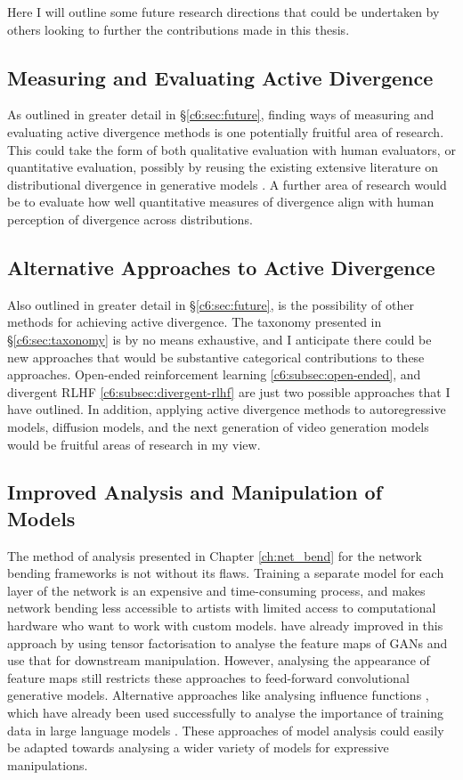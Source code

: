 Here I will outline some future research directions that could be undertaken by others looking to further the contributions made in this thesis.

\subsection{Measuring and Evaluating Active Divergence}
As outlined in greater detail in \S \ref{c6:sec:future}, finding ways of measuring and evaluating active divergence methods is one potentially fruitful area of research. 
This could take the form of both qualitative evaluation with human evaluators, or quantitative evaluation, possibly by reusing the existing extensive literature on distributional divergence in generative models \citep{gretton2019interpretable}.
A further area of research would be to evaluate how well quantitative measures of divergence align with human perception of divergence across distributions.

\subsection{Alternative Approaches to Active Divergence}
Also outlined in greater detail in \S \ref{c6:sec:future}, is the possibility of other methods for achieving active divergence. 
The taxonomy presented in \S \ref{c6:sec:taxonomy} is by no means exhaustive, and I anticipate there could be new approaches that would be substantive categorical contributions to these approaches. 
Open-ended reinforcement learning \ref{c6:subsec:open-ended}, and divergent RLHF \ref{c6:subsec:divergent-rlhf} are just two possible approaches that I have outlined. 
In addition, applying active divergence methods to autoregressive models, diffusion models, and the next generation of video generation models would be fruitful areas of research in my view.

\subsection{Improved Analysis and Manipulation of Models}

The method of analysis presented in Chapter \ref{ch:net_bend} for the network bending frameworks is not without its flaws.
Training a separate model for each layer of the network is an expensive and time-consuming process, and makes network bending less accessible to artists with limited access to computational hardware who want to work with custom models.
\cite{oldfield2022panda,oldfield2024bilinear} have already improved in this approach by using tensor factorisation to analyse the feature maps of GANs and use that for downstream manipulation.
However, analysing the appearance of feature maps still restricts these approaches to feed-forward convolutional generative models.
Alternative approaches like analysing influence functions \citep{koh2017understanding}, which have already been used successfully to analyse the importance of training data in large language models \citep{choe2024your}.
These approaches of model analysis could easily be adapted towards analysing a wider variety of models for expressive manipulations.

